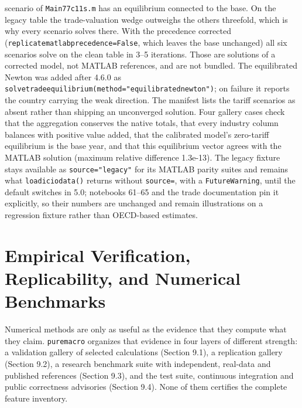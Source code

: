 \documentclass[11pt,letterpaper]{article}
\renewcommand{\_}{\pmunderscore\allowbreak}
\begin{document}
scenario of \texttt{Main77c\_11s.m} has an equilibrium connected to the base. On the legacy table the trade-valuation wedge outweighs the others threefold, which is why every scenario solves there. With the precedence corrected (\texttt{replicate\_matlab\_precedence=False}, which leaves the base unchanged) all six scenarios solve on the clean table in 3--5 iterations. Those are solutions of a corrected model, not MATLAB references, and are not bundled. The equilibrated Newton was added after 4.6.0 as \texttt{solve\_trade\_equilibrium(method="equilibrated\_newton")}; on failure it reports the country carrying the weak direction. The manifest lists the tariff scenarios as absent rather than shipping an unconverged solution. Four gallery cases check that the aggregation conserves the native totals, that every industry column balances with positive value added, that the calibrated model's zero-tariff equilibrium is the base year, and that this equilibrium vector agrees with the MATLAB solution (maximum relative difference 1.3e-13). The legacy fixture stays available as \texttt{source="legacy"} for its MATLAB parity suites and remains what \texttt{load\_icio\_data()} returns without \texttt{source=}, with a \texttt{FutureWarning}, until the default switches in 5.0; notebooks 61--65 and the trade documentation pin it explicitly, so their numbers are unchanged and remain illustrations on a regression fixture rather than OECD-based estimates.

\section{Empirical Verification, Replicability, and Numerical Benchmarks}\label{empirical-verification-replicability-and-numerical-benchmarks}

Numerical methods are only as useful as the evidence that they compute what they claim. \texttt{puremacro} organizes that evidence in four layers of different strength: a validation gallery of selected calculations (Section 9.1), a replication gallery (Section 9.2), a research benchmark suite with independent, real-data and published references (Section 9.3), and the test suite, continuous integration and public correctness advisories (Section 9.4). None of them certifies the complete feature inventory.
\end{document}

